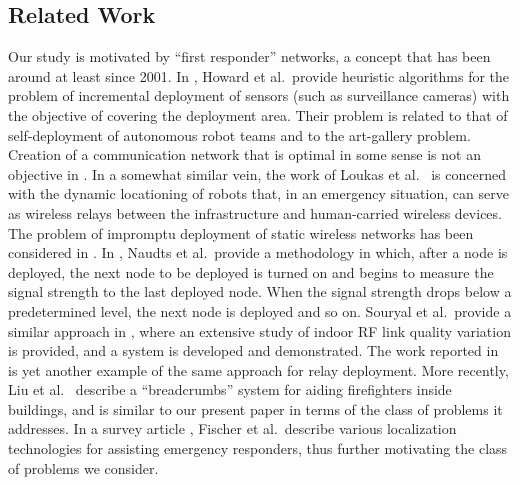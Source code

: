 \documentclass[conference]{IEEEtran}
\begin{document}
\subsection{Related Work}
Our study is motivated by ``first responder'' networks, a concept that
has been around at least since 2001.  In
\cite{howard-etal02incremental-self-deployment-algorithm}, Howard et
al.\ provide heuristic algorithms for the problem of incremental
deployment of sensors (such as surveillance cameras) with the
objective of covering the deployment area. Their problem is related to
that of self-deployment of autonomous robot teams and to the
art-gallery problem.  Creation of a communication network that is
optimal in some sense is not an objective in
\cite{howard-etal02incremental-self-deployment-algorithm}. In a
somewhat similar vein, the work of Loukas et al.\
\cite{mobihoc.loukas-etal08robotic-wireless-network-emergency} is
concerned with the dynamic locationing of robots that, in an emergency
situation, can serve as wireless relays between the infrastructure and
human-carried wireless devices.  The problem of impromptu deployment
of static wireless networks has been considered in
\cite{mobihoc.naudts-etal07monitoring-planning-tool,
  mobihoc.souryal-etal07real-time-deployment-range-extension,
  mobihoc.souryal-etal09rapidly-deployable-mesh-network-testbed,
  mobihoc.aurisch-tlle09relay-placement-emergency-response}.  In
\cite{mobihoc.naudts-etal07monitoring-planning-tool}, Naudts et al.\
provide a methodology in which, after a node is deployed, the next
node to be deployed is turned on and begins to measure the signal
strength to the last deployed node.  When the signal strength drops
below a predetermined level, the next node is deployed and so
on. Souryal et al.\ provide a similar approach in
\cite{mobihoc.souryal-etal07real-time-deployment-range-extension,
  mobihoc.souryal-etal09rapidly-deployable-mesh-network-testbed},
where an extensive study of indoor RF link quality variation is
provided, and a system is developed and demonstrated.  The work
reported in
\cite{mobihoc.aurisch-tlle09relay-placement-emergency-response} is yet
another example of the same approach for relay deployment. More
recently, Liu et al.\ \cite{Breadcrumb} describe a ``breadcrumbs''
system for aiding firefighters inside buildings, and is similar to our
present paper in terms of the class of problems it addresses.  In a
survey article \cite{Fischer}, Fischer et al.\ describe various
localization technologies for assisting emergency responders, thus
further motivating the class of problems we consider.
\end{document}
